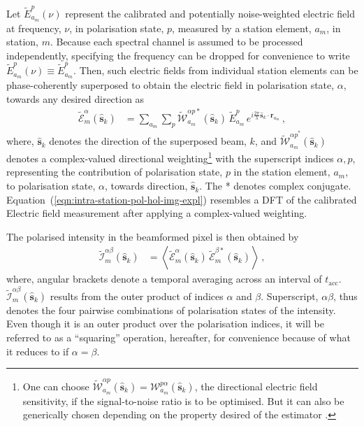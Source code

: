 \documentclass[
  journal=pasa,
  manuscript=article-type,
  year=2020,
  volume=37,
]{cup-journal}
\begin{document}
Let $\widetilde{E}_{a_m}^{p}(\nu)$ represent the calibrated and potentially noise-weighted electric field at frequency, $\nu$, in polarisation state, $p$, measured by a station element, $a_m$, in station, $m$. Because each spectral channel is assumed to be processed independently, specifying the frequency can be dropped for convenience to write $\widetilde{E}_{a_m}^{p}(\nu)\equiv \widetilde{E}_{a_m}^{p}$. Then, such electric fields from individual station elements
can be phase-coherently superposed to obtain the electric field in polarisation state, $\alpha$, towards any desired direction as
\begin{align}
    \widetilde{\mathcal{E}}_m^\alpha(\hat{\boldsymbol{s}}_k) &= \sum_{a_m} \sum_p  \widetilde{\mathcal{W}}_{a_m}^{\alpha p *}(\hat{\boldsymbol{s}}_k) \, \widetilde{E}_{a_m}^p \, e^{i\frac{2\pi}{\lambda} \hat{\boldsymbol{s}}_k\cdot\boldsymbol{r}_{a_m}} \, , \label{eqn:intra-station-pol-hol-img-expl}
\end{align}
where, $\hat{\boldsymbol{s}}_k$ denotes the direction of the superposed beam, $k$,
and $\widetilde{\mathcal{W}}_{a_m}^{{\alpha p}^*}(\hat{\boldsymbol{s}}_k)$ denotes a complex-valued directional weighting\footnote{One can choose $\widetilde{\mathcal{W}}_{a_m}^{\alpha p}(\hat{\boldsymbol{s}}_k)=\mathcal{W}_{a_m}^{p\alpha}(\hat{\boldsymbol{s}}_k)$, the directional electric field sensitivity, if the signal-to-noise ratio is to be optimised. But it can also be generically chosen depending on the property desired of the estimator \cite[][]{Morales2011}.} with the superscript indices $\alpha, p$, representing the contribution of polarisation state, $p$ in the station element, $a_m$, to polarisation state, $\alpha$, towards direction, $\hat{\boldsymbol{s}}_k$. The * denotes complex conjugate. Equation~(\ref{eqn:intra-station-pol-hol-img-expl}) resembles a DFT of the calibrated Electric field measurement after applying a complex-valued weighting.

The polarised intensity in the beamformed pixel is then obtained by
\begin{align}
    \widetilde{\mathcal{I}}^{\alpha\beta}_m(\hat{\boldsymbol{s}}_k) &= \left\langle \widetilde{\mathcal{E}}_m^\alpha(\hat{\boldsymbol{s}}_k) \,  \widetilde{\mathcal{E}}_m^{\beta *}(\hat{\boldsymbol{s}}_k) \right\rangle \, , \label{eqn:intra-station-opt-pol-img-outprod}
\end{align}
where, angular brackets denote a temporal averaging across an interval of $t_\textrm{acc}$. $\widetilde{\mathcal{I}}^{\alpha\beta}_m(\hat{\boldsymbol{s}}_k)$ results from the outer product of indices $\alpha$ and $\beta$. Superscript, $\alpha\beta$, thus denotes the four pairwise combinations of polarisation states of the intensity. Even though it is an outer product over the polarisation indices, it will be referred to as a ``squaring'' operation, hereafter, for convenience because of what it reduces to if $\alpha=\beta$.
\end{document}

